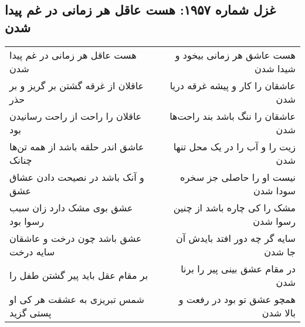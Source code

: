 \begin{center}
\section*{غزل شماره ۱۹۵۷: هست عاقل هر زمانی در غم پیدا شدن}
\label{sec:1957}
\begin{longtable}{l p{0.5cm} r}
هست عاقل هر زمانی در غم پیدا شدن
&&
هست عاشق هر زمانی بیخود و شیدا شدن
\\
عاقلان از غرقه گشتن بر گریز و بر حذر
&&
عاشقان را کار و پیشه غرقه دریا شدن
\\
عاقلان را راحت از راحت رسانیدن بود
&&
عاشقان را ننگ باشد بند راحت‌ها شدن
\\
عاشق اندر حلقه باشد از همه تن‌ها چنانک
&&
زیت را و آب را در یک محل تنها شدن
\\
و آنک باشد در نصیحت دادن عشاق عشق
&&
نیست او را حاصلی جز سخره سودا شدن
\\
عشق بوی مشک دارد زان سبب رسوا بود
&&
مشک را کی چاره باشد از چنین رسوا شدن
\\
عشق باشد چون درخت و عاشقان سایه درخت
&&
سایه گر چه دور افتد بایدش آن جا شدن
\\
بر مقام عقل باید پیر گشتن طفل را
&&
در مقام عشق بینی پیر را برنا شدن
\\
شمس تبریزی به عشقت هر کی او پستی گزید
&&
همچو عشق تو بود در رفعت و بالا شدن
\\
\end{longtable}
\end{center}
